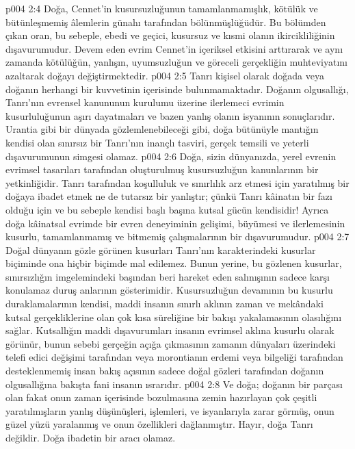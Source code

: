 \vs p004 2:4 Doğa, Cennet’in kusursuzluğunun tamamlanmamışlık, kötülük ve bütünleşmemiş âlemlerin günahı tarafından bölünmüşlüğüdür. Bu bölümden çıkan oran, bu sebeple, ebedi ve geçici, kusursuz ve kısmi olanın ikircikliliğinin dışavurumudur. Devem eden evrim Cennet’in içeriksel etkisini arttırarak ve aynı zamanda kötülüğün, yanlışın, uyumsuzluğun ve göreceli gerçekliğin muhteviyatını azaltarak doğayı değiştirmektedir.
\vs p004 2:5 Tanrı kişisel olarak doğada veya doğanın herhangi bir kuvvetinin içerisinde bulunmamaktadır. Doğanın olgusallığı, Tanrı’nın evrensel kanununun kurulumu üzerine ilerlemeci evrimin kusurluluğunun aşırı dayatmaları ve bazen yanlış olanın isyanının sonuçlarıdır. Urantia gibi bir dünyada gözlemlenebileceği gibi, doğa bütünüyle mantığın kendisi olan sınırsız bir Tanrı’nın inançlı tasviri, gerçek temsili ve yeterli dışavurumunun simgesi olamaz.
\vs p004 2:6 Doğa, sizin dünyanızda, yerel evrenin evrimsel tasarıları tarafından oluşturulmuş kusursuzluğun kanunlarının bir yetkinliğidir. Tanrı tarafından koşulluluk ve sınırlılık arz etmesi için yaratılmış bir doğaya ibadet etmek ne de tutarsız bir yanlıştır; çünkü Tanrı kâinatın bir fazı olduğu için ve bu sebeple kendisi başlı başına kutsal gücün kendisidir! Ayrıca doğa kâinatsal evrimde bir evren deneyiminin gelişimi, büyümesi ve ilerlemesinin kusurlu, tamamlanmamış ve bitmemiş çalışmalarının bir dışavurumudur.
\vs p004 2:7 Doğal dünyanın gözle görünen kusurları Tanrı’nın karakterindeki kusurlar biçiminde ona hiçbir biçimde mal edilemez. Bunun yerine, bu gözlenen kusurlar, sınırsızlığın imgelemindeki başından beri hareket eden salınışının sadece karşı konulamaz duruş anlarının gösterimidir. Kusursuzluğun devamının bu kusurlu duraklamalarının kendisi, maddi insanın sınırlı aklının zaman ve mekândaki kutsal gerçekliklerine olan çok kısa süreliğine bir bakışı yakalamasının olasılığını sağlar. Kutsallığın maddi dışavurumları insanın evrimsel aklına kusurlu olarak görünür, bunun sebebi gerçeğin açığa çıkmasının zamanın dünyaları üzerindeki telefi edici değişimi tarafından veya morontianın erdemi veya bilgeliği tarafından desteklenmemiş insan bakış açısının sadece doğal gözleri tarafından doğanın olgusallığına bakışta fani insanın ısrarıdır.
\vs p004 2:8 Ve doğa; doğanın bir parçası olan fakat onun zaman içerisinde bozulmasına zemin hazırlayan çok çeşitli yaratılmışların yanlış düşünüşleri, işlemleri, ve isyanlarıyla zarar görmüş, onun güzel yüzü yaralanmış ve onun özellikleri dağlanmıştır. Hayır, doğa Tanrı değildir. Doğa ibadetin bir aracı olamaz.
